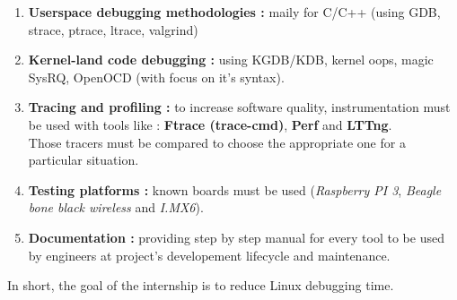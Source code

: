 \begin{enumerate}
	\item \textbf{Userspace debugging methodologies : } maily for C/C++ (using GDB, strace, ptrace, ltrace, valgrind)
	
	\item \textbf{Kernel-land code debugging : } using KGDB/KDB, kernel oops, magic SysRQ, OpenOCD (with focus on it's syntax).
	
	\item \textbf{Tracing and profiling : } to increase software quality, instrumentation must be used with tools like : \textbf{Ftrace (trace-cmd)}, \textbf{Perf} and \textbf{LTTng}.\\
Those tracers must be compared  to choose the appropriate one for a particular situation.

	\item \textbf{Testing platforms : } known boards must be used (\textit{Raspberry PI 3}, \textit{Beagle bone black wireless} and \textit{I.MX6}).
	
	\item \textbf{Documentation : } providing step by step manual for every tool to be used by engineers at project's developement lifecycle and maintenance.
\end{enumerate}




\begin{center}\Large
\color{red}In short, the goal of the internship is to reduce Linux debugging time.
\end{center}

